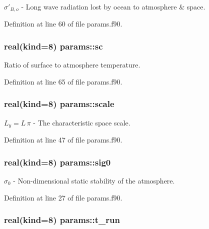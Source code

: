 $\sigma'_{B,o}$ -\/ Long wave radiation lost by ocean to atmosphere \& space. 



Definition at line 60 of file params.\-f90.

\hypertarget{classparams_a35c130eb539b9df8c52cc02427913cc0}{
\subsubsection[{sc}]{\setlength{\rightskip}{0pt plus 5cm}real(kind=8) params\-::sc}}\label{classparams_a35c130eb539b9df8c52cc02427913cc0}


Ratio of surface to atmosphere temperature. 



Definition at line 65 of file params.\-f90.

\hypertarget{classparams_a7803126847c2e1b2b4aced941ec9257b}{
\subsubsection[{scale}]{\setlength{\rightskip}{0pt plus 5cm}real(kind=8) params\-::scale}}\label{classparams_a7803126847c2e1b2b4aced941ec9257b}


$L_y = L \, \pi$ -\/ The characteristic space scale. 



Definition at line 47 of file params.\-f90.

\hypertarget{classparams_a9115211e1d9169ad56a3fa924c5f7ef3}{
\subsubsection[{sig0}]{\setlength{\rightskip}{0pt plus 5cm}real(kind=8) params\-::sig0}}\label{classparams_a9115211e1d9169ad56a3fa924c5f7ef3}


$\sigma_0$ -\/ Non-\/dimensional static stability of the atmosphere. 



Definition at line 27 of file params.\-f90.

\hypertarget{classparams_a923cab407956c82921069b7ec0e69eb9}{
\subsubsection[{t\-\_\-run}]{\setlength{\rightskip}{0pt plus 5cm}real(kind=8) params\-::t\-\_\-run}}\label{classparams_a923cab407956c82921069b7ec0e69eb9}


